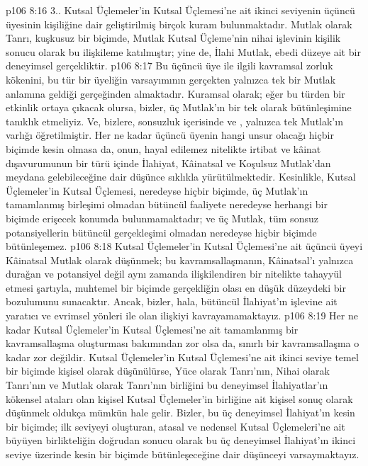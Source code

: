 \vs p106 8:16 3.\bibnobreakspace {}. Kutsal Üçlemeler’in Kutsal Üçlemesi’ne ait ikinci seviyenin üçüncü üyesinin kişiliğine dair geliştirilmiş birçok kuram bulunmaktadır. Mutlak olarak Tanrı, kuşkusuz bir biçimde, Mutlak Kutsal Üçleme’nin nihai işlevinin kişilik sonucu olarak bu ilişkileme katılmıştır; yine de, İlahi Mutlak, ebedi düzeye ait bir deneyimsel gerçekliktir.
\vs p106 8:17 Bu üçüncü üye ile ilgili kavramsal zorluk kökenini, bu tür bir üyeliğin varsayımının gerçekten yalnızca tek bir Mutlak anlamına geldiği gerçeğinden almaktadır. Kuramsal olarak; eğer bu türden bir etkinlik ortaya çıkacak olursa, bizler, üç Mutlak’ın bir tek olarak  bütünleşimine tanıklık etmeliyiz. Ve, bizlere, sonsuzluk içerisinde ve , yalnızca tek Mutlak’ın varlığı öğretilmiştir. Her ne kadar üçüncü üyenin hangi unsur olacağı hiçbir biçimde kesin olmasa da, onun, hayal edilemez nitelikte irtibat ve kâinat dışavurumunun bir türü içinde İlahiyat, Kâinatsal ve Koşulsuz Mutlak’dan meydana gelebileceğine dair düşünce sıklıkla yürütülmektedir. Kesinlikle, Kutsal Üçlemeler’in Kutsal Üçlemesi, neredeyse hiçbir biçimde, üç Mutlak’ın tamamlanmış birleşimi olmadan bütüncül faaliyete neredeyse herhangi bir biçimde erişecek konumda bulunmamaktadır; ve üç Mutlak, tüm sonsuz potansiyellerin bütüncül gerçekleşimi olmadan neredeyse hiçbir biçimde bütünleşemez.
\vs p106 8:18 Kutsal Üçlemeler’in Kutsal Üçlemesi’ne ait üçüncü üyeyi Kâinatsal Mutlak olarak düşünmek; bu kavramsallaşmanın, Kâinatsal’ı yalnızca durağan ve potansiyel değil aynı zamanda ilişkilendiren bir nitelikte tahayyül etmesi şartıyla, muhtemel bir biçimde gerçekliğin olası en düşük düzeydeki bir bozulumunu sunacaktır. Ancak, bizler, hala, bütüncül İlahiyat’ın işlevine ait yaratıcı ve evrimsel yönleri ile olan ilişkiyi kavrayamamaktayız.
\vs p106 8:19 Her ne kadar Kutsal Üçlemeler’in Kutsal Üçlemesi’ne ait tamamlanmış bir kavramsallaşma oluşturması bakımından zor olsa da, sınırlı bir kavramsallaşma o kadar zor değildir. Kutsal Üçlemeler’in Kutsal Üçlemesi’ne ait ikinci seviye temel bir biçimde kişisel olarak düşünülürse, Yüce olarak Tanrı’nın, Nihai olarak Tanrı’nın ve Mutlak olarak Tanrı’nın birliğini bu deneyimsel İlahiyatlar’ın kökensel ataları olan kişisel Kutsal Üçlemeler’in birliğine ait kişisel sonuç olarak düşünmek oldukça mümkün hale gelir. Bizler, bu üç deneyimsel İlahiyat’ın kesin bir biçimde; ilk seviyeyi oluşturan, atasal ve nedensel Kutsal Üçlemeleri’ne ait büyüyen birlikteliğin doğrudan sonucu olarak bu üç deneyimsel İlahiyat’ın ikinci seviye üzerinde kesin bir biçimde bütünleşeceğine dair düşünceyi varsaymaktayız.
